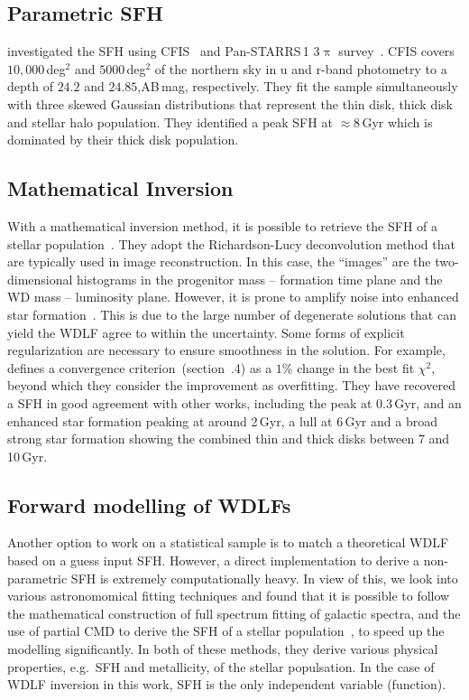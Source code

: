 \documentclass[fleqn,usenatbib]{mnras}
\begin{document}
\subsection{Parametric SFH}
\citet{2019ApJ...887..148F} investigated the SFH using
CFIS~\citep{2017ApJ...848..128I} and Pan-STARRS\,1 3$\uppi$
survey~\citep{2016arXiv161205560C}. CFIS covers $10,000$\,deg$^2$ and
$5000$\,deg$^2$ of the northern sky in u and r-band photometry to a depth of
$24.2$ and $24.85$,AB\,mag, respectively. They fit the sample simultaneously
with three skewed Gaussian distributions that represent the thin disk, thick
disk and stellar halo population. They identified a peak SFH at $\approx8$\,Gyr
which is dominated by their thick disk population.

\subsection{Mathematical Inversion}
With a mathematical inversion method, it is possible to retrieve the SFH of a
stellar population~\citep{2013MNRAS.434.1549R}. They adopt the Richardson-Lucy 
deconvolution method that are typically used in image reconstruction. In this
case, the ``images'' are the two-dimensional histograms in the
progenitor mass -- formation time plane and the WD mass -- luminosity plane. 
However, it is prone to amplify noise into enhanced star 
formation~\citep{2014ApJ...791...92T}. This is due to the large number of
degenerate solutions that can yield the WDLF agree to within the uncertainty.
Some forms of explicit regularization are necessary to ensure smoothness in the
solution. For example, \citet{2013MNRAS.434.1549R} defines a convergence
criterion~(section~.4) as a $1\%$ change in the best fit
$\chi^2$, beyond which they consider the improvement as overfitting. They have 
recovered a SFH in good agreement with other works, including the peak at
0.3\,Gyr, and an enhanced star formation peaking at around 2\,Gyr, a lull at
6\,Gyr and a broad strong star formation showing the combined thin and thick
disks between 7 and 10\,Gyr.

\subsection{Forward modelling of WDLFs}
Another option to work on a statistical sample is to match a theoretical
WDLF based on a guess input SFH. However, a direct implementation to derive a
non-parametric SFH is extremely computationally heavy. In view of this, we look
into various astronomomical fitting techniques and found that it is possible to
follow the mathematical construction of full spectrum fitting of galactic
spectra, and the use of partial CMD to derive the SFH of a stellar
population~\citep{2006A&A...459..783C}, to speed up the modelling significantly.
In both of these methods, they derive various physical properties, e.g.\ SFH and
metallicity, of the stellar populsation. In the case of WDLF inversion in this
work, SFH is the only independent variable (function).
\end{document}
